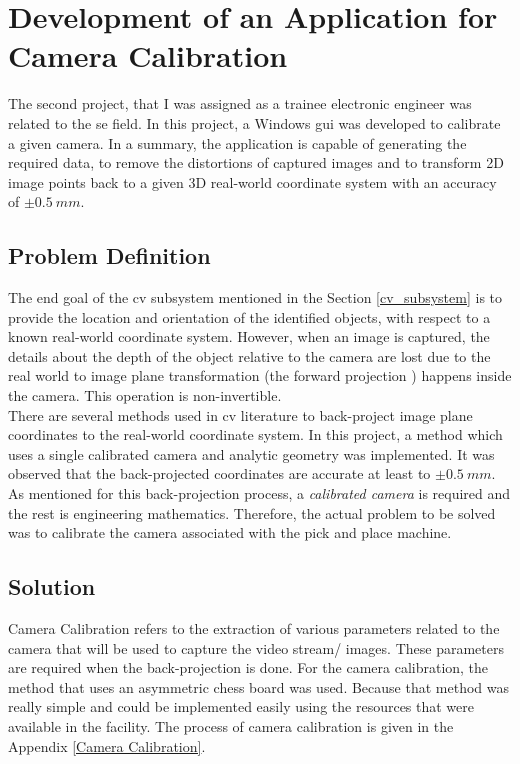 \documentclass[a4paper,12pt]{report}
\begin{document}
\section{Development of an Application for Camera Calibration}
\label{Development of an Application for Camera Calibration}
The second project, that I was assigned as a trainee electronic engineer was related to the \ac{se} field. In this project, a Windows \ac{gui} was developed to calibrate a given camera. In a summary, the application is capable of generating the required data, to remove the distortions of captured images and to transform 2D image points back to a given 3D real-world coordinate system with an accuracy of $\pm 0.5 ~mm$.

\subsection{Problem Definition}

The end goal of the \ac{cv} subsystem mentioned in the Section \ref{cv_subsystem} is to provide the location and orientation of the identified objects, with respect to a known real-world coordinate system. However, when an image is captured, the details about the depth of the object relative to the camera are lost due to the real world to image plane transformation (the forward projection \cite{hartley_zisserman_2004}) happens inside the camera. This operation is non-invertible.\\

There are several methods used in \ac{cv}  literature to back-project image plane coordinates to the real-world coordinate system. In this project, a method which uses a single calibrated camera and analytic geometry was implemented. It was observed that the back-projected coordinates are accurate at least to $\pm 0.5 ~mm$. As mentioned for this back-projection process, a \textit{calibrated camera} is required and the rest is engineering mathematics. Therefore, the actual problem to be solved was to calibrate the camera associated with the pick and place machine.



\subsection{Solution}
Camera Calibration refers to the extraction of various parameters related to the camera that will be used to capture the video stream/ images. These parameters are required when the back-projection is done. For the camera calibration, the method that uses an asymmetric chess board was used\cite{cam_calib:_nodate}. Because that method was really simple and could be implemented easily using the resources that were available in the facility. The process of camera calibration is given in the Appendix \ref{Camera Calibration}.\\
\end{document}
